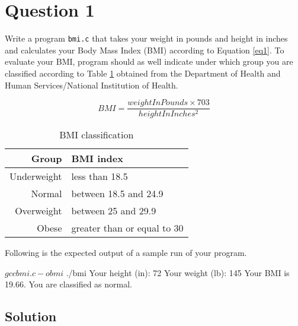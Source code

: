 \documentclass[12pt,letterpaper,twoside]{article}
\begin{document}


\section*{Question 1}

Write a program \texttt{bmi.c} that takes your weight in pounds and height in inches and calculates your Body Mass Index (BMI) according to Equation \ref{eq1}.
To evaluate your BMI, program should as well indicate under which group you are classified according to Table \ref{tab1} obtained from the Department of Health and Human Services/National Institution of Health.

\begin{equation}
BMI = \frac{weightInPounds \times 703}{heightInInches^2}
\label{eq1}
\end{equation}

\begin{table}[H]\centering
\begin{tabular}{|r|l|}
\hline
Group & BMI index \\
\hline
Underweight & less than 18.5 \\
Normal & between 18.5 and 24.9 \\
Overweight & between 25 and 29.9 \\
Obese & greater than or equal to 30 \\
\hline
\end{tabular}
\caption{BMI classification}\label{tab1}
\end{table}

Following is the expected output of a sample run of your program.

\begin{terminal}
$ gcc bmi.c -o bmi
$ ./bmi
Your height (in): 72
Your weight (lb): 145
Your BMI is 19.66.
You are classified as normal.
\end{terminal}

\newpage

\subsection*{Solution}

\lstset{language=c,tabsize=4}


\newpage
\end{document}
